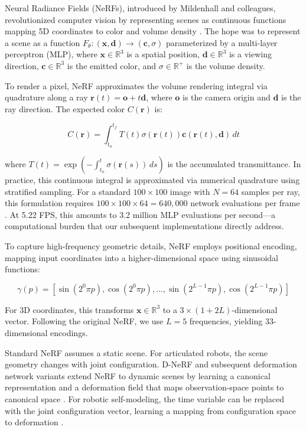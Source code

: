 \documentclass[12pt,a4paper,oneside]{report}
\begin{document}
Neural Radiance Fields (NeRFs), introduced by Mildenhall and colleagues, revolutionized computer vision by representing scenes as continuous functions mapping 5D coordinates to color and volume density \cite{mildenhall2020nerf}. The hope was to represent a scene as a function $F_\theta: (\mathbf{x}, \mathbf{d}) \rightarrow (\mathbf{c}, \sigma)$ parameterized by a multi-layer perceptron (MLP), where $\mathbf{x} \in \mathbb{R}^3$ is a spatial position, $\mathbf{d} \in \mathbb{R}^3$ is a viewing direction, $\mathbf{c} \in \mathbb{R}^3$ is the emitted color, and $\sigma \in \mathbb{R}^+$ is the volume density.

To render a pixel, NeRF approximates the volume rendering integral via quadrature along a ray $\mathbf{r}(t) = \mathbf{o} + t\mathbf{d}$, where $\mathbf{o}$ is the camera origin and $\mathbf{d}$ is the ray direction. The expected color $C(\mathbf{r})$ is:

\begin{equation}
C(\mathbf{r}) = \int_{t_n}^{t_f} T(t) \sigma(\mathbf{r}(t)) \mathbf{c}(\mathbf{r}(t), \mathbf{d}) \, dt
\end{equation}

where $T(t) = \exp\left(-\int_{t_n}^{t} \sigma(\mathbf{r}(s)) \, ds\right)$ is the accumulated transmittance. In practice, this continuous integral is approximated via numerical quadrature using stratified sampling. For a standard $100 \times 100$ image with $N = 64$ samples per ray, this formulation requires $100 \times 100 \times 64 = 640,000$ network evaluations per frame \cite{mildenhall2020nerf}. At 5.22 FPS, this amounts to 3.2 million MLP evaluations per second—a computational burden that our subsequent implementations directly address.

To capture high-frequency geometric details, NeRF employs positional encoding, mapping input coordinates into a higher-dimensional space using sinusoidal functions:

\begin{equation}
\gamma(p) = [\sin(2^0 \pi p), \cos(2^0 \pi p), \ldots, \sin(2^{L-1} \pi p), \cos(2^{L-1} \pi p)]
\end{equation}

For 3D coordinates, this transforms $\mathbf{x} \in \mathbb{R}^3$ to a $3 \times (1 + 2L)$-dimensional vector. Following the original NeRF, we use $L = 5$ frequencies, yielding 33-dimensional encodings.

Standard NeRF assumes a static scene. For articulated robots, the scene geometry changes with joint configuration. D-NeRF and subsequent deformation network variants extend NeRF to dynamic scenes by learning a canonical representation and a deformation field that maps observation-space points to canonical space \cite{pumarola2021d, park2021nerfies}. For robotic self-modeling, the time variable can be replaced with the joint configuration vector, learning a mapping from configuration space to deformation \cite{hu2024teaching}.
\end{document}
